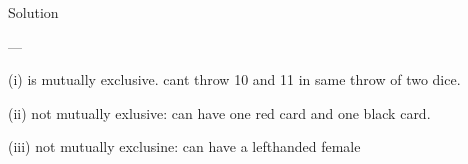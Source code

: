\begin{framed}


Solution

--- 
\item[(i)] is mutually exclusive. cant throw 10 and 11 in same throw of two dice.


\item[(ii)] not mutually exlusive: can have one red card and one black card.


\item[(iii)] not mutually exclusine: can have a lefthanded female

\end{framed}





